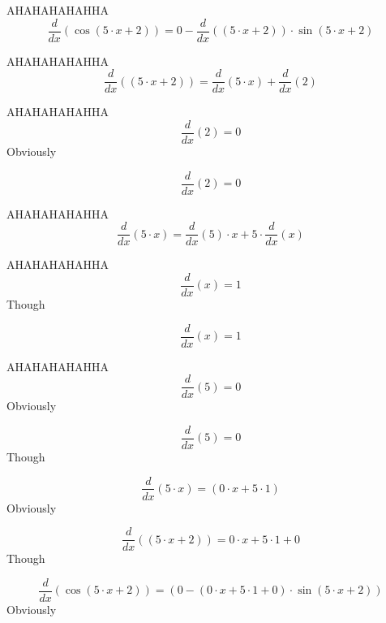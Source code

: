 \documentclass[12pt,a4paper]{extreport}
\begin{document}
AHAHAHAHAHHA
\begin{dmath*}
    \frac{d}{dx}\left(\cos \left(5\cdot x+2\right)\right) =  0  - \frac{d}{dx}\left(\left(5\cdot x+2\right)\right) \cdot \sin\left(5\cdot x+2\right)
\end{dmath*}

AHAHAHAHAHHA
\begin{dmath*}
    \frac{d}{dx}\left(\left(5\cdot x+2\right)\right) = \frac{d}{dx}\left(5\cdot x\right) + \frac{d}{dx}\left(2\right)
\end{dmath*}

AHAHAHAHAHHA
\begin{dmath*}
    \frac{d}{dx}\left(2\right) =  0 
\end{dmath*}
Obviously


\begin{dmath*}
    \frac{d}{dx} \left(2\right) = 0
\end{dmath*}

AHAHAHAHAHHA
\begin{dmath*}
    \frac{d}{dx}\left(5\cdot x\right) = \frac{d}{dx}\left(5\right) \cdot x + 5 \cdot \frac{d}{dx}\left(x\right)
\end{dmath*}

AHAHAHAHAHHA
\begin{dmath*}
    \frac{d}{dx}\left(x\right) =  1 
\end{dmath*}
Though


\begin{dmath*}
    \frac{d}{dx} \left(x\right) = 1
\end{dmath*}

AHAHAHAHAHHA
\begin{dmath*}
    \frac{d}{dx}\left(5\right) =  0 
\end{dmath*}
Obviously


\begin{dmath*}
    \frac{d}{dx} \left(5\right) = 0
\end{dmath*}
Though


\begin{dmath*}
    \frac{d}{dx} \left(5\cdot x\right) = \left(0\cdot x+5\cdot 1\right)
\end{dmath*}
Obviously


\begin{dmath*}
    \frac{d}{dx} \left(\left(5\cdot x+2\right)\right) = 0\cdot x+5\cdot 1+0
\end{dmath*}
Though


\begin{dmath*}
    \frac{d}{dx} \left(\cos \left(5\cdot x+2\right)\right) = \left(0-\left(0\cdot x+5\cdot 1+0\right)\cdot \sin \left(5\cdot x+2\right)\right)
\end{dmath*}
Obviously
\end{document}
